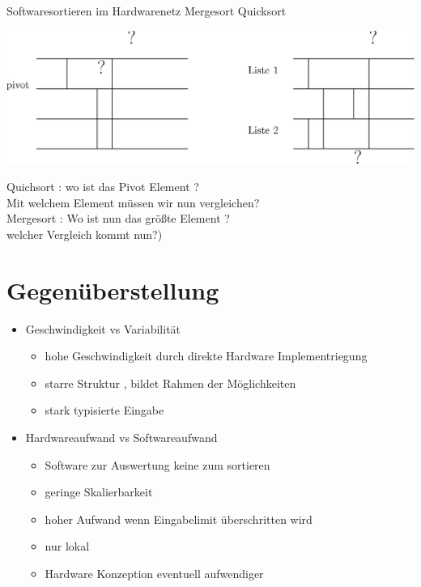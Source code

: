 \documentclass[ucs,9pt]{beamer}
\begin{document}
\begin{frame}{Softwaresortieren im Hardwarenetz}
Mergesort Quicksort
    \begin{center}
    		\includegraphics[scale=0.65]{mergesort.eps}
\end{center}     
 {Quichsort : wo ist das Pivot Element ?\\ Mit welchem Element müssen wir nun vergleichen?}\\
 {Mergesort : Wo ist nun das größte Element ? \\welcher Vergleich kommt nun?)}
\end{frame}

\section{Gegenüberstellung}
\begin{frame}
    \begin{itemize}
        \item Geschwindigkeit vs Variabilität
        \begin{itemize}
            \item hohe Geschwindigkeit durch direkte Hardware Implementriegung
            \item starre Struktur , bildet Rahmen der Möglichkeiten
            \item stark typisierte Eingabe
        \end{itemize}
    \item Hardwareaufwand vs Softwareaufwand
        \begin{itemize}
            \item Software zur Auswertung keine zum sortieren
            \item geringe Skalierbarkeit
            \item hoher Aufwand wenn Eingabelimit überschritten wird
            \item nur lokal
            \item Hardware Konzeption eventuell aufwendiger
        \end{itemize}
    \end{itemize}
\end{frame}
\end{document}
